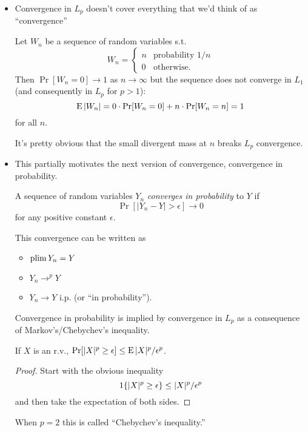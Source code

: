 \begin{itemize}[leftmargin=0pt]

\item Convergence in $L_p$ doesn't cover everything that we'd think of
  as ``convergence''
  \begin{ex}
    Let $W_n$ be a sequence of random variables s.t.
    \begin{equation*}
      W_n =
      \begin{cases}
        n & \text{probability } 1/n \\
        0 & \text{otherwise}.
      \end{cases}
    \end{equation*}
    Then $\Pr[W_n = 0] \to 1$ as $n \to \infty$ but the sequence does not
    converge in $L_1$ (and consequently in $L_p$ for $p > 1$):
    \begin{equation*}
      \operatorname{E} | W_n | = 0 \cdot \operatorname{Pr}[W_n = 0] + n \cdot \operatorname{Pr}[W_n = n] = 1
    \end{equation*}
    for all $n$.
  \end{ex}
  It's pretty obvious that the small divergent mass at $n$ breaks
  $L_p$ convergence.

\item This partially motivates the next version of convergence,
  convergence in probability.
  \begin{defn}
    A sequence of random variables $Y_n$ \emph{converges in
    probability} to $Y$ if
    \begin{equation*}
      \Pr[ | Y_n - Y | > \epsilon] \to 0
    \end{equation*}
    for any positive constant $\epsilon$.
  \end{defn}
  This convergence can be written as
  \begin{itemize}
  \item $\operatorname*{plim} Y_n = Y$
  \item $Y_n \to^p Y$
  \item $Y_n \to Y$ i.p. (or ``in probability'').
  \end{itemize}

  Convergence in probability is implied by convergence in $L_p$
  as a consequence of Markov's/Chebychev's inequality.
  \begin{thm}
    If $X$ is an r.v., $\operatorname{Pr}[ |X|^p \geq \epsilon ] \leq \operatorname{E} |X|^p /\epsilon^p$.
  \end{thm}
  \begin{proof}
    Start with the obvious inequality
    \begin{equation*}
      \operatorname{1}\{ |X|^p \geq \epsilon \} \leq |X|^p / \epsilon^p
    \end{equation*}
    and then take the expectation of both sides.
  \end{proof}
  When $p = 2$ this is called ``Chebychev's inequality.''


\end{itemize}
